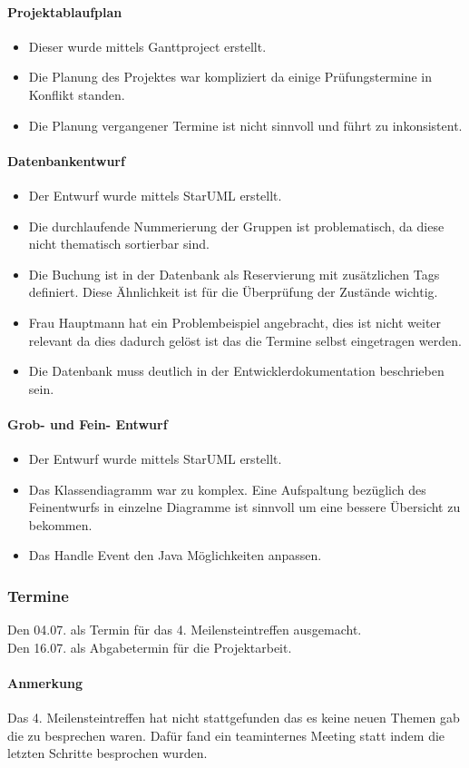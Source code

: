 \paragraph{Projektablaufplan}
\begin{itemize}
\item Dieser wurde mittels Ganttproject erstellt. 
\item Die Planung des Projektes war kompliziert da einige Prüfungstermine in Konflikt standen.
\item Die Planung vergangener Termine ist nicht sinnvoll und führt zu inkonsistent.
\end{itemize}

\paragraph{Datenbankentwurf}
\begin{itemize}
\item Der Entwurf wurde mittels StarUML erstellt.
\item Die durchlaufende Nummerierung der Gruppen ist problematisch, da diese nicht thematisch sortierbar sind.
\item Die Buchung ist in der Datenbank als Reservierung mit zusätzlichen Tags definiert. Diese Ähnlichkeit ist für die Überprüfung der Zustände wichtig.
\item Frau Hauptmann hat ein Problembeispiel angebracht, dies ist nicht weiter relevant da dies dadurch gelöst ist das die Termine selbst eingetragen werden.
\item Die Datenbank muss deutlich in der Entwicklerdokumentation beschrieben sein.
\end{itemize}

\paragraph{Grob- und Fein- Entwurf}
\begin{itemize}
\item Der Entwurf wurde mittels StarUML erstellt.
\item Das Klassendiagramm war zu komplex. Eine Aufspaltung bezüglich des Feinentwurfs in einzelne Diagramme ist sinnvoll um eine bessere Übersicht zu bekommen. 
\item Das Handle Event den Java Möglichkeiten anpassen.
\end{itemize}

\subsubsection{Termine}

Den 04.07. als Termin für das 4. Meilensteintreffen ausgemacht.
\\Den 16.07. als Abgabetermin für die Projektarbeit.

\paragraph{Anmerkung}
Das  4. Meilensteintreffen hat nicht stattgefunden das es keine neuen Themen gab die zu besprechen waren.
Dafür fand ein teaminternes Meeting statt indem die letzten Schritte besprochen wurden.